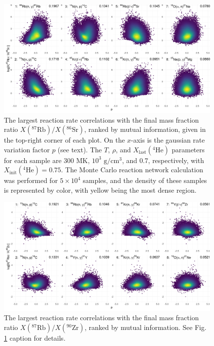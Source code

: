 

\begin{figure}[t]
\centering
\includegraphics[width=6.4in]{Chapter-3/figs/corr_density_87Rb86Sr.png}
\caption{\label{fig:Corr_Dens_87Rb86Sr}The largest reaction rate correlations with the final mass fraction ratio $X(^{87}\mathrm{Rb})/X(^{86}\mathrm{Sr})$, ranked by mutual information, given in the top-right corner of each plot. On the $x$-axis is the gaussian rate variation factor $p$ (see text). The $T$, $\rho$, and $X_{\mathrm{last}}(^{4}\mathrm{He})$ parameters for each sample are 300 MK, $10^{3}$ $\mathrm{g}/\mathrm{cm}^{3}$, and 0.7, respectively, with $X_{\mathrm{init}}(^{4}\mathrm{He}) = 0.75$. The Monte Carlo reaction network calculation was performed for $5 \times 10^{4}$ samples, and the density of these samples is represented by color, with yellow being the most dense region.}
\end{figure}


\begin{figure}[!h]
\centering
\includegraphics[width=6.4in]{Chapter-3/figs/corr_density_87Rb90Zr.png}
\caption{\label{fig:Corr_Dens_87Rb90Zr}The largest reaction rate correlations with the final mass fraction ratio $X(^{87}\mathrm{Rb})/X(^{90}\mathrm{Zr})$, ranked by mutual information. See Fig. \ref{fig:Corr_Dens_87Rb86Sr} caption for details.}
\end{figure}

